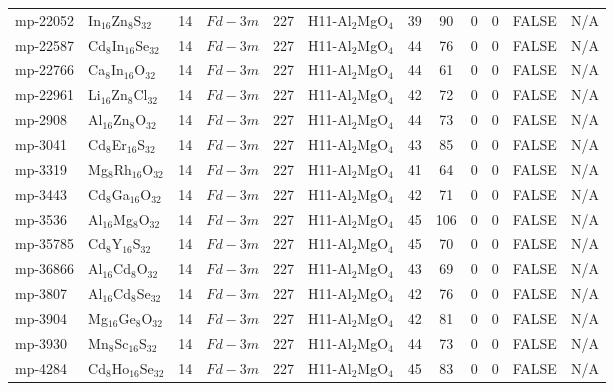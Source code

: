 {\begin{longtable}{llcccccccccc}
    mp-22052 & In$_{16}$Zn$_{8}$S$_{32}$ & 14    & $Fd-3m$ & 227   & H11-Al$_{2}$MgO$_{4}$ & 39    & 90    & 0     & 0     & FALSE & N/A \\
    mp-22587 & Cd$_{8}$In$_{16}$Se$_{32}$ & 14    & $Fd-3m$ & 227   & H11-Al$_{2}$MgO$_{4}$ & 44    & 76    & 0     & 0     & FALSE & N/A \\
    mp-22766 & Ca$_{8}$In$_{16}$O$_{32}$ & 14    & $Fd-3m$ & 227   & H11-Al$_{2}$MgO$_{4}$ & 44    & 61    & 0     & 0     & FALSE & N/A \\
    mp-22961 & Li$_{16}$Zn$_{8}$Cl$_{32}$ & 14    & $Fd-3m$ & 227   & H11-Al$_{2}$MgO$_{4}$ & 42    & 72    & 0     & 0     & FALSE & N/A \\
    mp-2908 & Al$_{16}$Zn$_{8}$O$_{32}$ & 14    & $Fd-3m$ & 227   & H11-Al$_{2}$MgO$_{4}$ & 44    & 73    & 0     & 0     & FALSE & N/A \\
    mp-3041 & Cd$_{8}$Er$_{16}$S$_{32}$ & 14    & $Fd-3m$ & 227   & H11-Al$_{2}$MgO$_{4}$ & 43    & 85    & 0     & 0     & FALSE & N/A \\
    mp-3319 & Mg$_{8}$Rh$_{16}$O$_{32}$ & 14    & $Fd-3m$ & 227   & H11-Al$_{2}$MgO$_{4}$ & 41    & 64    & 0     & 0     & FALSE & N/A \\
    mp-3443 & Cd$_{8}$Ga$_{16}$O$_{32}$ & 14    & $Fd-3m$ & 227   & H11-Al$_{2}$MgO$_{4}$ & 42    & 71    & 0     & 0     & FALSE & N/A \\
    mp-3536 & Al$_{16}$Mg$_{8}$O$_{32}$ & 14    & $Fd-3m$ & 227   & H11-Al$_{2}$MgO$_{4}$ & 45    & 106   & 0     & 0     & FALSE & N/A \\
    mp-35785 & Cd$_{8}$Y$_{16}$S$_{32}$ & 14    & $Fd-3m$ & 227   & H11-Al$_{2}$MgO$_{4}$ & 45    & 70    & 0     & 0     & FALSE & N/A \\
    mp-36866 & Al$_{16}$Cd$_{8}$O$_{32}$ & 14    & $Fd-3m$ & 227   & H11-Al$_{2}$MgO$_{4}$ & 43    & 69    & 0     & 0     & FALSE & N/A \\
    mp-3807 & Al$_{16}$Cd$_{8}$Se$_{32}$ & 14    & $Fd-3m$ & 227   & H11-Al$_{2}$MgO$_{4}$ & 42    & 76    & 0     & 0     & FALSE & N/A \\
    mp-3904 & Mg$_{16}$Ge$_{8}$O$_{32}$ & 14    & $Fd-3m$ & 227   & H11-Al$_{2}$MgO$_{4}$ & 42    & 81    & 0     & 0     & FALSE & N/A \\
    mp-3930 & Mn$_{8}$Sc$_{16}$S$_{32}$ & 14    & $Fd-3m$ & 227   & H11-Al$_{2}$MgO$_{4}$ & 44    & 73    & 0     & 0     & FALSE & N/A \\
    mp-4284 & Cd$_{8}$Ho$_{16}$Se$_{32}$ & 14    & $Fd-3m$ & 227   & H11-Al$_{2}$MgO$_{4}$ & 45    & 83    & 0     & 0     & FALSE & N/A \\

\end{longtable}}

